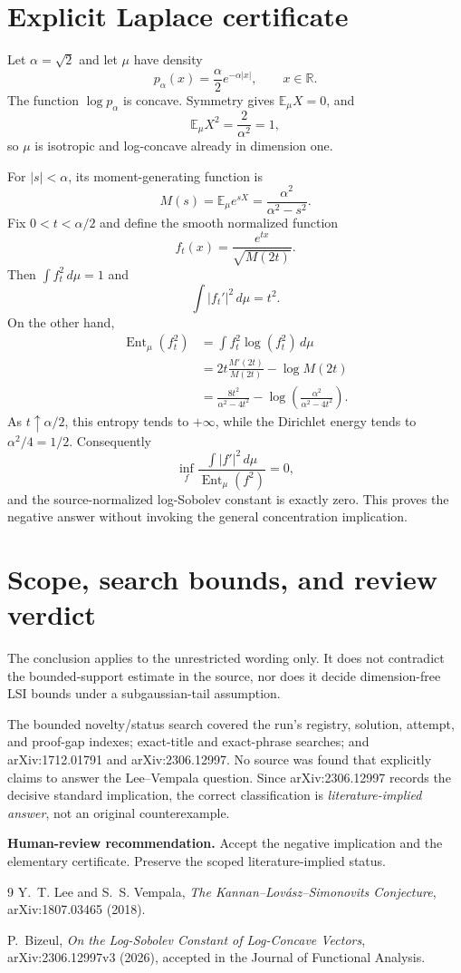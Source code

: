 \documentclass[10pt]{article}
\begin{document}
\section{Explicit Laplace certificate}

Let $\alpha=\sqrt2$ and let $\mu$ have density
\[
  p_\alpha(x)=\frac{\alpha}{2}e^{-\alpha|x|},\qquad x\in\mathbb R.
\]
The function $\log p_\alpha$ is concave. Symmetry gives
$\mathbb E_\mu X=0$, and
\[
  \mathbb E_\mu X^2=\frac{2}{\alpha^2}=1,
\]
so $\mu$ is isotropic and log-concave already in dimension one.

For $|s|<\alpha$, its moment-generating function is
\[
  M(s)=\mathbb E_\mu e^{sX}=\frac{\alpha^2}{\alpha^2-s^2}.
\]
Fix $0<t<\alpha/2$ and define the smooth normalized function
\[
  f_t(x)=\frac{e^{tx}}{\sqrt{M(2t)}}.
\]
Then $\int f_t^2\,d\mu=1$ and
\[
  \int |f_t'|^2\,d\mu=t^2.
\]
On the other hand,
\begin{align*}
  \operatorname{Ent}_\mu(f_t^2)
  &=\int f_t^2\log(f_t^2)\,d\mu \\
  &=2t\frac{M'(2t)}{M(2t)}-\log M(2t) \\
  &=\frac{8t^2}{\alpha^2-4t^2}
    -\log\!\left(\frac{\alpha^2}{\alpha^2-4t^2}\right).
\end{align*}
As $t\uparrow\alpha/2$, this entropy tends to $+\infty$, while the
Dirichlet energy tends to $\alpha^2/4=1/2$. Consequently
\[
  \inf_f
  \frac{\int |f'|^2\,d\mu}{\operatorname{Ent}_\mu(f^2)}=0,
\]
and the source-normalized log-Sobolev constant is exactly zero. This proves
the negative answer without invoking the general concentration implication.

\section{Scope, search bounds, and review verdict}

The conclusion applies to the unrestricted wording only. It does not
contradict the bounded-support estimate in the source, nor does it decide
dimension-free LSI bounds under a subgaussian-tail assumption.

The bounded novelty/status search covered the run's registry, solution,
attempt, and proof-gap indexes; exact-title and exact-phrase searches; and
arXiv:1712.01791 and arXiv:2306.12997. No source was found that explicitly
claims to answer the Lee--Vempala question. Since arXiv:2306.12997 records the
decisive standard implication, the correct classification is
\emph{literature-implied answer}, not an original counterexample.

\textbf{Human-review recommendation.} Accept the negative implication and
the elementary certificate. Preserve the scoped literature-implied status.

\begin{thebibliography}{9}
Y.~T. Lee and S.~S. Vempala,
\emph{The Kannan--Lov\'asz--Simonovits Conjecture},
arXiv:1807.03465 (2018).

P.~Bizeul,
\emph{On the Log-Sobolev Constant of Log-Concave Vectors},
arXiv:2306.12997v3 (2026), accepted in the Journal of Functional Analysis.
\end{thebibliography}
\end{document}
